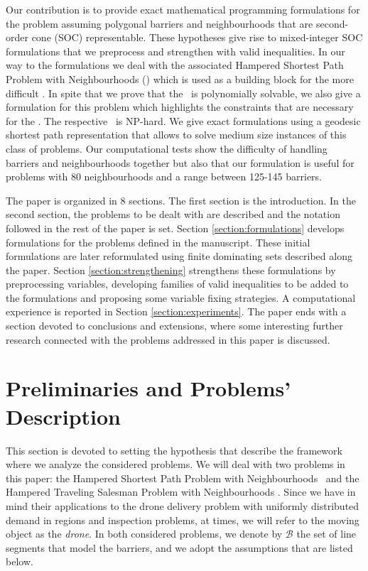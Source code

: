 \documentclass[a4paper,  review, authoryear, 1p.]{elsarticle}
\newcommand{\SPPN}{{\sf{H-SPPN}\xspace }}
\newcommand{\TSPN}{{\sf{H-TSPN}\xspace }}
\begin{document}
		Our contribution is to provide exact mathematical programming formulations for the problem assuming polygonal barriers and neighbourhoods that are second-order cone (SOC) representable. These hypotheses give rise to mixed-integer SOC formulations that we preprocess and strengthen with valid inequalities. In our way to the formulations we deal with the associated Hampered Shortest Path Problem with Neighbourhoods (\SPPN ) which is used as a building block for the more difficult \TSPN . In spite that we prove that the \SPPN \ is polynomially solvable, we also give a formulation for this problem which highlights the constraints that are necessary for the \TSPN. The respective \TSPN \ is NP-hard. We give exact formulations using a geodesic shortest path representation that allows to solve medium size instances of this class of problems. Our computational tests show the difficulty of handling barriers and neighbourhoods together  but also that our formulation is useful for problems with 80 neighbourhoods and a range between 125-145 barriers.
		
	
		The paper is organized in 8 sections. The first section is the introduction. In the second section, the problems to be dealt with are described and the notation followed in the rest of the paper is set. Section \ref{section:formulations} develops formulations for the problems defined in the manuscript. These initial formulations are later reformulated using finite dominating sets described along the paper.
		Section \ref{section:strengthening}  strengthens these formulations  by preprocessing variables, developing  families of  valid inequalities to be added to the formulations and proposing some variable fixing strategies. A computational experience is reported in Section \ref{section:experiments}. The paper ends with a section devoted to conclusions and extensions, where some interesting further research connected with the problems addressed in this paper is discussed.
		
		
		\section{Preliminaries and Problems'  Description \label{section:description}}
		This section is devoted to setting the hypothesis that describe the framework where we analyze the considered problems.
		We will deal with two problems in this paper: the Hampered Shortest Path Problem with Neighbourhoods \SPPN \ and the Hampered Traveling Salesman Problem with Neighbourhoods \TSPN. Since we have in mind their applications to the drone delivery problem with uniformly distributed demand in regions and inspection problems, at times, we will refer to the moving object as the \textit{drone}. In both considered problems, we denote by $\mathcal{B}$ the set of line segments that model the barriers, and we adopt the  assumptions that are listed below.
		
\end{document}
